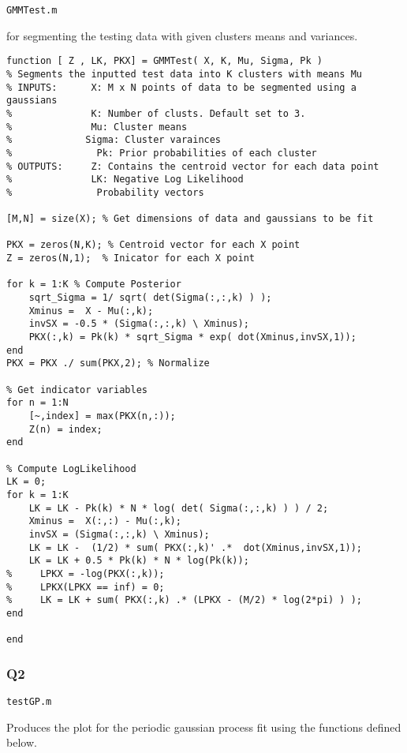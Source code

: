\documentclass{article}
\begin{document}

\texttt{GMMTest.m}

for segmenting the testing data with given clusters means and variances.

\begin{lstlisting}
function [ Z , LK, PKX] = GMMTest( X, K, Mu, Sigma, Pk )
% Segments the inputted test data into K clusters with means Mu
% INPUTS:      X: M x N points of data to be segmented using a gaussians
%              K: Number of clusts. Default set to 3.
%              Mu: Cluster means
%             Sigma: Cluster varainces
%               Pk: Prior probabilities of each cluster
% OUTPUTS:     Z: Contains the centroid vector for each data point
%              LK: Negative Log Likelihood
%               Probability vectors

[M,N] = size(X); % Get dimensions of data and gaussians to be fit

PKX = zeros(N,K); % Centroid vector for each X point
Z = zeros(N,1);  % Inicator for each X point

for k = 1:K % Compute Posterior
    sqrt_Sigma = 1/ sqrt( det(Sigma(:,:,k) ) );
    Xminus =  X - Mu(:,k);
    invSX = -0.5 * (Sigma(:,:,k) \ Xminus);
    PKX(:,k) = Pk(k) * sqrt_Sigma * exp( dot(Xminus,invSX,1));
end
PKX = PKX ./ sum(PKX,2); % Normalize

% Get indicator variables
for n = 1:N
    [~,index] = max(PKX(n,:));
    Z(n) = index;
end

% Compute LogLikelihood
LK = 0;
for k = 1:K
    LK = LK - Pk(k) * N * log( det( Sigma(:,:,k) ) ) / 2;
    Xminus =  X(:,:) - Mu(:,k);
    invSX = (Sigma(:,:,k) \ Xminus);
    LK = LK -  (1/2) * sum( PKX(:,k)' .*  dot(Xminus,invSX,1));
    LK = LK + 0.5 * Pk(k) * N * log(Pk(k));
%     LPKX = -log(PKX(:,k));
%     LPKX(LPKX == inf) = 0;
%     LK = LK + sum( PKX(:,k) .* (LPKX - (M/2) * log(2*pi) ) );
end

end
\end{lstlisting}


\subsubsection{Q2}

\texttt{testGP.m}

Produces the plot for the periodic gaussian process fit using the functions defined below.
\end{document}
